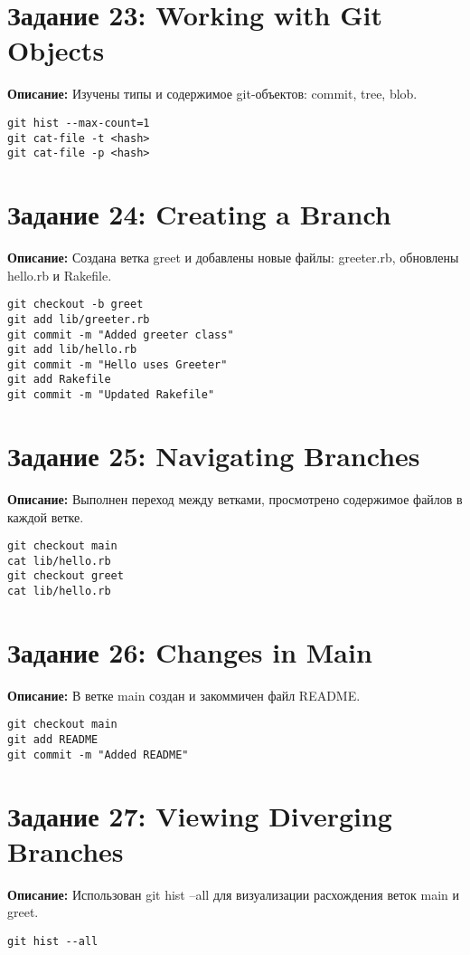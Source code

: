 \documentclass[a4paper,12pt]{report}
\begin{document}
\section*{Задание 23: Working with Git Objects}
\textbf{Описание:} Изучены типы и содержимое git-объектов: commit, tree, blob.
\begin{verbatim}
git hist --max-count=1
git cat-file -t <hash>
git cat-file -p <hash>
\end{verbatim}

\section*{Задание 24: Creating a Branch}
\textbf{Описание:} Создана ветка greet и добавлены новые файлы: greeter.rb, обновлены hello.rb и Rakefile.
\begin{verbatim}
git checkout -b greet
git add lib/greeter.rb
git commit -m "Added greeter class"
git add lib/hello.rb
git commit -m "Hello uses Greeter"
git add Rakefile
git commit -m "Updated Rakefile"
\end{verbatim}

\section*{Задание 25: Navigating Branches}
\textbf{Описание:} Выполнен переход между ветками, просмотрено содержимое файлов в каждой ветке.
\begin{verbatim}
git checkout main
cat lib/hello.rb
git checkout greet
cat lib/hello.rb
\end{verbatim}

\section*{Задание 26: Changes in Main}
\textbf{Описание:} В ветке main создан и закоммичен файл README.
\begin{verbatim}
git checkout main
git add README
git commit -m "Added README"
\end{verbatim}

\section*{Задание 27: Viewing Diverging Branches}
\textbf{Описание:} Использован git hist --all для визуализации расхождения веток main и greet.
\begin{verbatim}
git hist --all
\end{verbatim}
\end{document}
